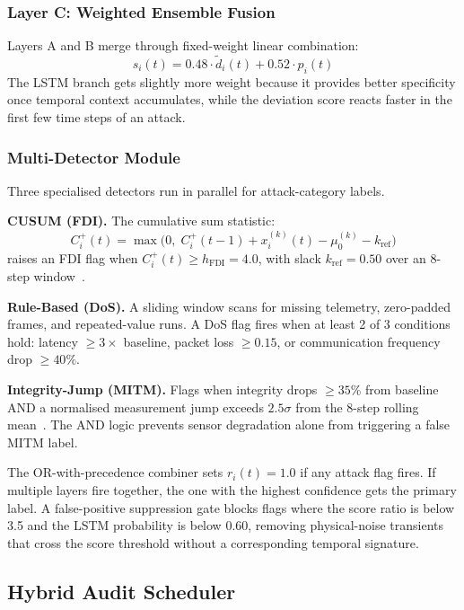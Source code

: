 \documentclass[conference,a4paper]{IEEEtran}
\begin{document}
\subsubsection{Layer C: Weighted Ensemble Fusion}

Layers A and B merge through fixed-weight linear combination:
\begin{equation}
s_i(t) = 0.48 \cdot \tilde{d}_i(t) + 0.52 \cdot p_i(t)
\label{eq:ensemble}
\end{equation}
The LSTM branch gets slightly more weight because it provides better specificity once temporal context accumulates, while the deviation score reacts faster in the first few time steps of an attack.

\subsubsection{Multi-Detector Module}

Three specialised detectors run in parallel for attack-category labels.

\textbf{CUSUM (FDI).} The cumulative sum statistic:
\begin{equation}
C_i^+(t) = \max\!\bigl(0,\; C_i^+(t{-}1) + x_i^{(k)}(t) - \mu_0^{(k)} - k_{\text{ref}}\bigr)
\label{eq:cusum}
\end{equation}
raises an FDI flag when $C_i^+(t) \geq h_{\text{FDI}} = 4.0$, with slack $k_{\text{ref}}=0.50$ over an 8-step window~\cite{b2}.

\textbf{Rule-Based (DoS).} A sliding window scans for missing telemetry, zero-padded frames, and repeated-value runs. A DoS flag fires when at least 2 of 3 conditions hold: latency $\geq 3\times$ baseline, packet loss $\geq 0.15$, or communication frequency drop $\geq 40\%$.

\textbf{Integrity-Jump (MITM).} Flags when integrity drops $\geq 35\%$ from baseline AND a normalised measurement jump exceeds $2.5\sigma$ from the 8-step rolling mean~\cite{b4}. The AND logic prevents sensor degradation alone from triggering a false MITM label.

The OR-with-precedence combiner sets $r_i(t)=1.0$ if any attack flag fires. If multiple layers fire together, the one with the highest confidence gets the primary label. A false-positive suppression gate blocks flags where the score ratio is below 3.5 and the LSTM probability is below 0.60, removing physical-noise transients that cross the score threshold without a corresponding temporal signature.

\subsection{Hybrid Audit Scheduler}
\end{document}
